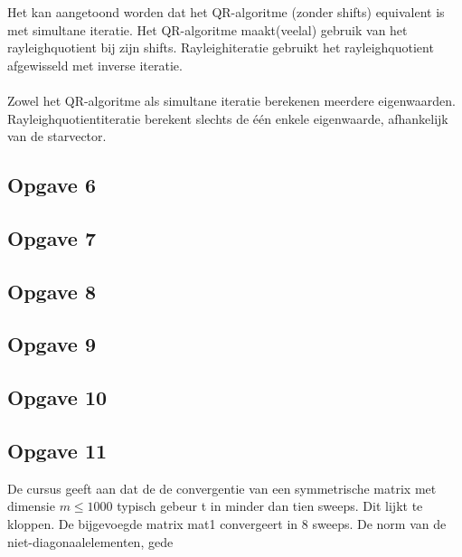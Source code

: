 \documentclass[een]{practicumverslag}
\begin{document}
Het kan aangetoond worden dat het QR-algoritme (zonder shifts) equivalent is met simultane iteratie. Het QR-algoritme maakt(veelal) gebruik van het rayleighquotient bij zijn shifts. Rayleighiteratie gebruikt het rayleighquotient afgewisseld met inverse iteratie.\\
\\
Zowel het QR-algoritme als simultane iteratie berekenen meerdere eigenwaarden.
Rayleighquotientiteratie berekent slechts de één enkele eigenwaarde, afhankelijk van de starvector.
\subsection*{Opgave 6}

\lipsum[7-7]

\subsection*{Opgave 7}

\lipsum[7-7]

\subsection*{Opgave 8}

\lipsum[7-7]

\subsection*{Opgave 9}

\lipsum[7-7]

\subsection*{Opgave 10}

\lipsum[7-7]

\subsection*{Opgave 11}

De cursus geeft aan dat de de convergentie van een symmetrische matrix met dimensie $m\leq 1000$ typisch gebeur t in minder dan tien sweeps. Dit lijkt te kloppen. De bijgevoegde matrix mat1 convergeert in 8 sweeps. De norm van de niet-diagonaalelementen, gede                                                                                                                                                                                                                                                                        
\end{document}

